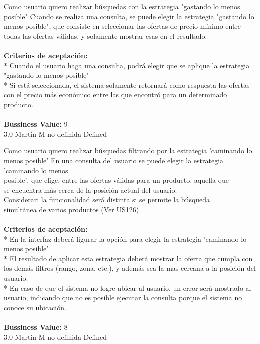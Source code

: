	{Como usuario quiero realizar búsquedas con la estrategia "gastando lo menos posible"} %
	{Cuando se realiza una consulta, se puede elegir la estrategia "gastando lo\\
menos posible", que consiste en seleccionar las ofertas de precio mínimo entre\\
todas las ofertas válidas, y solamente mostrar esas en el resultado.\\
  \\
\textbf{Criterios de aceptación:}\\
* Cuando el usuario haga una consulta, podrá elegir que se aplique la estrategia "gastando lo menos posible"  \\
* Si está seleccionada, el sistema solamente retornará como respuesta las ofertas con el precio más económico entre las que encontró para un determinado producto. \\
  \\
\textbf{Bussiness Value:} 9\\
} %
	{} %
	{3.0} %
	{Martin M} %
	{no definida} %
	{Defined} %


\vspace{20pt}

	{Como usuario quiero realizar búsquedas filtrando por la estrategia 'caminando lo menos posible'} %
	{En una consulta del usuario se puede elegir la estrategia 'caminando lo menos\\
posible', que elige, entre las ofertas válidas para un producto, aquella que\\
se encuentra más cerca de la posición actual del usuario.\\
Considerar: la funcionalidad será distinta si se permite la búsqueda\\
simultánea de varios productos (Ver US126).\\
  \\
\textbf{Criterios de aceptación:}\\
* En la interfaz deberá figurar la opción para elegir la estrategia 'caminando lo menos posible'\\
* El resultado de aplicar esta estrategia deberá mostrar la oferta que cumpla con los demás filtros (rango, zona, etc.), y además sea la mas cercana a la posición del usuario.\\
* En caso de que el sistema no logre ubicar al usuario, un error será mostrado al usuario, indicando que no es posible ejecutar la consulta porque el sistema no conoce su ubicación.\\
  \\
\textbf{Bussiness Value:} 8\\
} %
	{} %
	{3.0} %
	{Martin M} %
	{no definida} %
	{Defined} %


